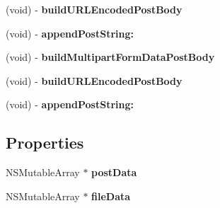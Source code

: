 \begin{DoxyCompactItemize}
\item 
\hypertarget{interface_a_s_i_form_data_request_07_08_a2927a87a8bfc64e29f5df6f0ea4792b7}{
(void) -\/ {\bfseries build\-U\-R\-L\-Encoded\-Post\-Body}}
\label{interface_a_s_i_form_data_request_07_08_a2927a87a8bfc64e29f5df6f0ea4792b7}

\item 
\hypertarget{interface_a_s_i_form_data_request_07_08_a1e91db0b76ca2a2129a597f65fae0c79}{
(void) -\/ {\bfseries append\-Post\-String\-:}}
\label{interface_a_s_i_form_data_request_07_08_a1e91db0b76ca2a2129a597f65fae0c79}

\item 
\hypertarget{interface_a_s_i_form_data_request_07_08_a55154abc422c9c4497599337ebc1c932}{
(void) -\/ {\bfseries build\-Multipart\-Form\-Data\-Post\-Body}}
\label{interface_a_s_i_form_data_request_07_08_a55154abc422c9c4497599337ebc1c932}

\item 
\hypertarget{interface_a_s_i_form_data_request_07_08_a2927a87a8bfc64e29f5df6f0ea4792b7}{
(void) -\/ {\bfseries build\-U\-R\-L\-Encoded\-Post\-Body}}
\label{interface_a_s_i_form_data_request_07_08_a2927a87a8bfc64e29f5df6f0ea4792b7}

\item 
\hypertarget{interface_a_s_i_form_data_request_07_08_a1e91db0b76ca2a2129a597f65fae0c79}{
(void) -\/ {\bfseries append\-Post\-String\-:}}
\label{interface_a_s_i_form_data_request_07_08_a1e91db0b76ca2a2129a597f65fae0c79}

\end{DoxyCompactItemize}
\subsection*{\-Properties}
\begin{DoxyCompactItemize}
\item 
\hypertarget{interface_a_s_i_form_data_request_07_08_ad9a2536c489b4e65a03343286399b232}{
\-N\-S\-Mutable\-Array $\ast$ {\bfseries post\-Data}}
\label{interface_a_s_i_form_data_request_07_08_ad9a2536c489b4e65a03343286399b232}

\item 
\hypertarget{interface_a_s_i_form_data_request_07_08_a7274fef3978001f2974e41a4817ffad8}{
\-N\-S\-Mutable\-Array $\ast$ {\bfseries file\-Data}}
\label{interface_a_s_i_form_data_request_07_08_a7274fef3978001f2974e41a4817ffad8}

\end{DoxyCompactItemize}


